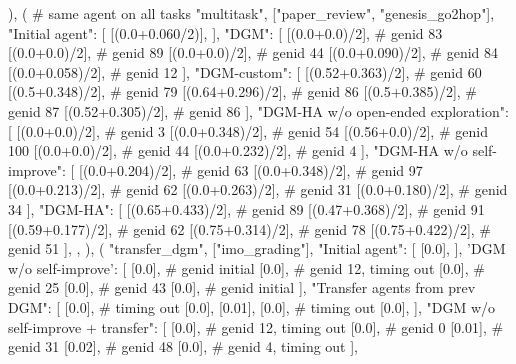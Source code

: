         ),
        (
            # same agent on all tasks
            "multitask",
            ["paper_review", "genesis_go2hop"],
            {
                "Initial agent": [
                    [(0.0+0.060/2)],
                ],
                "DGM": [
                    [(0.0+0.0)/2],  # genid 83
                    [(0.0+0.0)/2],  # genid 89
                    [(0.0+0.0)/2],  # genid 44
                    [(0.0+0.090)/2],  # genid 84
                    [(0.0+0.058)/2],  # genid 12
                ],
                "DGM-custom": [
                    [(0.52+0.363)/2],  # genid 60
                    [(0.5+0.348)/2],  # genid 79
                    [(0.64+0.296)/2],  # genid 86
                    [(0.5+0.385)/2],  # genid 87
                    [(0.52+0.305)/2],  # genid 86
                ],
                "DGM-HA w/o open-ended exploration": [
                    [(0.0+0.0)/2],  # genid 3
                    [(0.0+0.348)/2],  # genid 54
                    [(0.56+0.0)/2],  # genid 100
                    [(0.0+0.0)/2],  # genid 44
                    [(0.0+0.232)/2],  # genid 4
                ],
                "DGM-HA w/o self-improve": [
                    [(0.0+0.204)/2],  # genid 63
                    [(0.0+0.348)/2],  # genid 97
                    [(0.0+0.213)/2],  # genid 62
                    [(0.0+0.263)/2],  # genid 31
                    [(0.0+0.180)/2],  # genid 34
                ],
                "DGM-HA": [
                    [(0.65+0.433)/2],  # genid 89
                    [(0.47+0.368)/2],  # genid 91
                    [(0.59+0.177)/2],  # genid 62
                    [(0.75+0.314)/2],  # genid 78
                    [(0.75+0.422)/2],  # genid 51
                ],
            },
        ),
        (
            "transfer_dgm",
            ["imo_grading"],
            {
                "Initial agent": [
                    [0.0],
                ],
                'DGM w/o self-improve': [
                    [0.0],  # genid initial
                    [0.0],  # genid 12, timing out
                    [0.0],  # genid 25
                    [0.0],  # genid 43
                    [0.0],  # genid initial
                ],
                "Transfer agents from prev DGM": [
                    [0.0],  # timing out
                    [0.0],
                    [0.01],
                    [0.0],  # timing out
                    [0.0],
                ],
                "DGM w/o self-improve + transfer": [
                    [0.0],  # genid 12, timing out
                    [0.0],  # genid 0
                    [0.01],  # genid 31
                    [0.02],  # genid 48
                    [0.0],  # genid 4, timing out
                ],
            }
